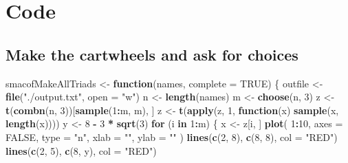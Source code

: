 \documentclass[
  12pt,
]{article}
\newenvironment{Shaded}{\begin{snugshade}}{\end{snugshade}}
\newcommand{\AttributeTok}[1]{\textcolor[rgb]{0.13,0.29,0.53}{#1}}
\newcommand{\ConstantTok}[1]{\textcolor[rgb]{0.56,0.35,0.01}{#1}}
\newcommand{\ControlFlowTok}[1]{\textcolor[rgb]{0.13,0.29,0.53}{\textbf{#1}}}
\newcommand{\DecValTok}[1]{\textcolor[rgb]{0.00,0.00,0.81}{#1}}
\newcommand{\FunctionTok}[1]{\textcolor[rgb]{0.13,0.29,0.53}{\textbf{#1}}}
\newcommand{\NormalTok}[1]{#1}
\newcommand{\OtherTok}[1]{\textcolor[rgb]{0.56,0.35,0.01}{#1}}
\newcommand{\SpecialCharTok}[1]{\textcolor[rgb]{0.81,0.36,0.00}{\textbf{#1}}}
\newcommand{\StringTok}[1]{\textcolor[rgb]{0.31,0.60,0.02}{#1}}
\begin{document}
\section{Code}\label{code}

\subsection{Make the cartwheels and ask for choices}\label{make-the-cartwheels-and-ask-for-choices}

\begin{Shaded}
\begin{Highlighting}[]
\NormalTok{smacofMakeAllTriads }\OtherTok{\textless{}{-}} \ControlFlowTok{function}\NormalTok{(names, }\AttributeTok{complete =} \ConstantTok{TRUE}\NormalTok{) \{}
\NormalTok{  outfile }\OtherTok{\textless{}{-}} \FunctionTok{file}\NormalTok{(}\StringTok{"./output.txt"}\NormalTok{, }\AttributeTok{open =} \StringTok{"w"}\NormalTok{)}
\NormalTok{  n }\OtherTok{\textless{}{-}} \FunctionTok{length}\NormalTok{(names)}
\NormalTok{  m }\OtherTok{\textless{}{-}} \FunctionTok{choose}\NormalTok{(n, }\DecValTok{3}\NormalTok{)}
\NormalTok{  z }\OtherTok{\textless{}{-}} \FunctionTok{t}\NormalTok{(}\FunctionTok{combn}\NormalTok{(n, }\DecValTok{3}\NormalTok{))[}\FunctionTok{sample}\NormalTok{(}\DecValTok{1}\SpecialCharTok{:}\NormalTok{m, m), ]}
\NormalTok{  z }\OtherTok{\textless{}{-}} \FunctionTok{t}\NormalTok{(}\FunctionTok{apply}\NormalTok{(z, }\DecValTok{1}\NormalTok{, }\ControlFlowTok{function}\NormalTok{(x)}
    \FunctionTok{sample}\NormalTok{(x, }\FunctionTok{length}\NormalTok{(x))))}
\NormalTok{  y }\OtherTok{\textless{}{-}} \DecValTok{8} \SpecialCharTok{{-}} \DecValTok{3} \SpecialCharTok{*} \FunctionTok{sqrt}\NormalTok{(}\DecValTok{3}\NormalTok{)}
  \ControlFlowTok{for}\NormalTok{ (i }\ControlFlowTok{in} \DecValTok{1}\SpecialCharTok{:}\NormalTok{m) \{}
\NormalTok{    x }\OtherTok{\textless{}{-}}\NormalTok{ z[i, ]}
    \FunctionTok{plot}\NormalTok{(}
      \DecValTok{1}\SpecialCharTok{:}\DecValTok{10}\NormalTok{,}
      \AttributeTok{axes =} \ConstantTok{FALSE}\NormalTok{,}
      \AttributeTok{type =} \StringTok{"n"}\NormalTok{,}
      \AttributeTok{xlab =} \StringTok{""}\NormalTok{,}
      \AttributeTok{ylab =} \StringTok{""}
\NormalTok{    )}
    \FunctionTok{lines}\NormalTok{(}\FunctionTok{c}\NormalTok{(}\DecValTok{2}\NormalTok{, }\DecValTok{8}\NormalTok{), }\FunctionTok{c}\NormalTok{(}\DecValTok{8}\NormalTok{, }\DecValTok{8}\NormalTok{), }\AttributeTok{col =} \StringTok{"RED"}\NormalTok{)}
    \FunctionTok{lines}\NormalTok{(}\FunctionTok{c}\NormalTok{(}\DecValTok{2}\NormalTok{, }\DecValTok{5}\NormalTok{), }\FunctionTok{c}\NormalTok{(}\DecValTok{8}\NormalTok{, y), }\AttributeTok{col =} \StringTok{"RED"}\NormalTok{)}

\end{Highlighting}
\end{Shaded}
\end{document}
